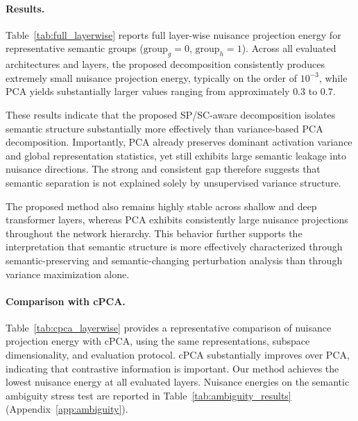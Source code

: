 \paragraph{Results.}
Table~\ref{tab:full_layerwise} reports full layer-wise nuisance projection energy for representative semantic groups ($\mathrm{group}_g=0$, $\mathrm{group}_h=1$). Across all evaluated architectures and layers, the proposed decomposition consistently produces extremely small nuisance projection energy, typically on the order of $10^{-3}$, while PCA yields substantially larger values ranging from approximately $0.3$ to $0.7$.

These results indicate that the proposed SP/SC-aware decomposition isolates semantic structure substantially more effectively than variance-based PCA decomposition. Importantly, PCA already preserves dominant activation variance and global representation statistics, yet still exhibits large semantic leakage into nuisance directions. The strong and consistent gap therefore suggests that semantic separation is not explained solely by unsupervised variance structure.

The proposed method also remains highly stable across shallow and deep transformer layers, whereas PCA exhibits consistently large nuisance projections throughout the network hierarchy. This behavior further supports the interpretation that semantic structure is more effectively characterized through semantic-preserving and semantic-changing perturbation analysis than through variance maximization alone.

\paragraph{Comparison with cPCA.} %
Table~\ref{tab:cpca_layerwise} provides a representative comparison of nuisance projection energy with cPCA, using the same representations, subspace dimensionality, and evaluation protocol. cPCA substantially improves over PCA, indicating that contrastive information is important. Our method achieves the lowest nuisance energy at all evaluated layers. Nuisance energies on the semantic ambiguity stress test are reported in Table~\ref{tab:ambiguity_results} (Appendix~\ref{app:ambiguity}).

